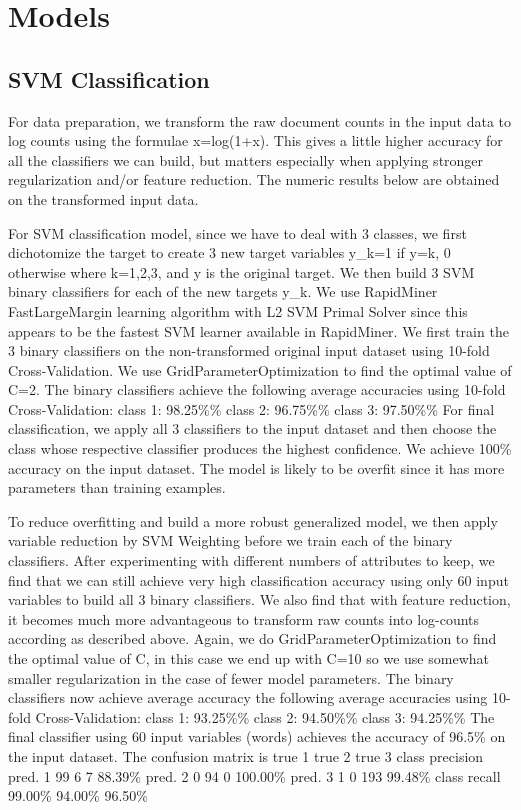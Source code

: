 \section{Models}
\subsection{SVM Classification}
For data preparation, we transform the raw document counts in the input data to log counts using the formulae x=log(1+x). This gives a little higher accuracy for all the classifiers we can build, but matters especially when applying stronger regularization and/or feature reduction. The numeric results below are obtained on the transformed input data.

For SVM classification model, since we have to deal with 3 classes, we first dichotomize the target to create 3 new target variables y_{k}=1 if y=k, 0 otherwise where k=1,2,3, and y is the original target. We then build 3 SVM binary classifiers for each of the new targets y_{k}. We use RapidMiner FastLargeMargin learning algorithm with L2 SVM Primal Solver since this appears to be the fastest SVM learner available in RapidMiner.
We first train the 3 binary classifiers on the non-transformed original input dataset using 10-fold Cross-Validation. We use GridParameterOptimization to find the optimal value of C=2. The binary classifiers achieve the following average accuracies using 10-fold Cross-Validation:
class 1: 98.25\%\%
class 2: 96.75\%\%
class 3: 97.50\%\%
For final classification, we apply all 3 classifiers to the input dataset and then choose the class whose respective classifier produces the highest confidence. We achieve 100\% accuracy on the input dataset. The model is likely to be overfit since it has more parameters than training examples.

To reduce overfitting and build a more robust generalized model, we then apply variable reduction by SVM Weighting before we train each of the binary classifiers. After experimenting with different numbers of attributes to keep, we find that we can still achieve very high classification accuracy using only 60 input variables to build all 3 binary classifiers. We also find that with feature reduction, it becomes much more advantageous to transform raw counts into log-counts according as described above. Again, we do GridParameterOptimization to find the optimal value of C, in this case we end up with C=10 so we use somewhat smaller regularization in the case of fewer model parameters.
The binary classifiers now achieve average accuracy the following average accuracies using 10-fold Cross-Validation:
class 1: 93.25\%\%
class 2: 94.50\%\%
class 3: 94.25\%\%
The final classifier using 60 input variables (words) achieves the accuracy of 96.5\% on the input dataset.
The confusion matrix is
	    true 1	true 2	true 3	class precision
pred. 1	99	     6	    7	       88.39\%
pred. 2	0	     94	    0	       100.00\%
pred. 3	1	     0	   193	       99.48\%
class recall	99.00\%	94.00\%	96.50\%	

